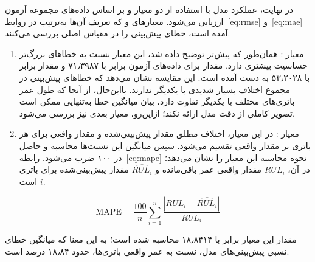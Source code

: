 در نهایت، عملکرد مدل با استفاده از دو معیار و بر اساس داده‌های مجموعه آزمون ارزیابی می‌شود. معیارهای  و  که تعریف آن‌ها به‌ترتیب در روابط~\eqref{eq:rmse} و~\eqref{eq:mae} آمده است، خطای پیش‌بینی را در مقیاس اصلی بررسی می‌کنند.

\begin{enumerate}
\item معیار : همان‌طور که پیش‌تر توضیح داده شد، این معیار نسبت به خطاهای بزرگ‌تر حساسیت بیشتری دارد. مقدار  برای داده‌های آزمون برابر با ۷۱٫۳۹۸۷ و مقدار  برابر با ۵۳٫۲۰۲۸ به دست آمده است. این مقایسه نشان می‌دهد که خطاهای پیش‌بینی در مجموع اختلاف بسیار شدیدی با یکدیگر ندارند. بااین‌حال، از آنجا که طول عمر باتری‌های مختلف با یکدیگر تفاوت دارد، بیان میانگین خطا به‌تنهایی ممکن است تصویر کاملی از دقت مدل ارائه نکند؛ ازاین‌رو، معیار بعدی نیز بررسی می‌شود.
\item معیار : در این معیار، اختلاف مطلق مقدار پیش‌بینی‌شده و مقدار واقعی برای هر باتری بر مقدار واقعی تقسیم می‌شود. سپس میانگین این نسبت‌ها محاسبه و حاصل در ۱۰۰ ضرب می‌شود. رابطه~\eqref{eq:mape} نحوه محاسبه این معیار را نشان می‌دهد؛ در آن، $RUL_i$ مقدار واقعی عمر باقی‌مانده و $\widehat{RUL_i}$ مقدار پیش‌بینی‌شده برای باتری $i$ است.
\end{enumerate}

\begin{equation}
\mathrm{MAPE} = \frac{100}{n}\sum_{i=1}^{n}\frac{\left| RUL_i - \widehat{RUL_i}\right|}{RUL_i}
\label{eq:mape}
\end{equation}

مقدار این معیار برابر با ۱۸٫۸۴۱۴ محاسبه شده است؛ به این معنا که میانگین خطای نسبی پیش‌بینی‌های مدل، نسبت به عمر واقعی باتری‌ها، حدود ۱۸٫۸۴ درصد است.
